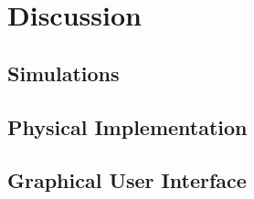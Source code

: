 
\section{Discussion}
\subsection{Simulations}

\subsection{Physical Implementation}


\subsection{Graphical User Interface}

